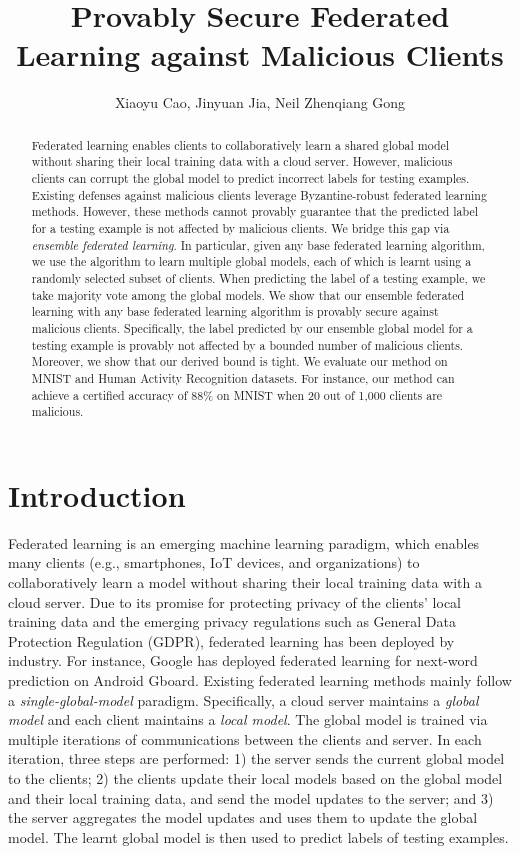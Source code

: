 \documentclass[letterpaper]{article} %
\title{Provably Secure Federated Learning against Malicious Clients}
\author{
       Xiaoyu Cao,
       Jinyuan Jia,
       Neil Zhenqiang Gong \\
}
\begin{document}
\maketitle



\begin{abstract}
Federated learning enables clients to collaboratively learn a shared global model without sharing their local training data with a cloud server. However, malicious clients can corrupt the global model to predict incorrect labels for testing examples. Existing defenses against malicious clients leverage Byzantine-robust federated learning methods. However, these methods cannot provably guarantee that the predicted label for a testing example is  not affected by malicious clients.  We bridge this gap via \emph{ensemble federated learning}.  In particular, given any base federated learning algorithm, we use the algorithm to learn multiple global models, each of which is learnt using a randomly selected subset of clients. When predicting the label of a testing example, we take majority vote among the  global models. We show that our ensemble federated learning with any base federated learning algorithm is provably secure against malicious clients. Specifically, the label predicted by our ensemble global model for a testing example is provably not affected by a bounded number of malicious clients. Moreover, we show that our derived bound is tight. We evaluate our method on MNIST and Human Activity Recognition datasets. For instance, our method can achieve a certified accuracy of 88\% on MNIST when 20 out of 1,000 clients are malicious.
\end{abstract}


\section{Introduction}

Federated learning \cite{konevcny2016federated,mcmahan2016communication} is an emerging machine learning paradigm, which enables many clients (e.g., smartphones, IoT devices, and organizations) to collaboratively learn a model without sharing their local training data with a cloud server. Due to its promise for protecting privacy of the clients' local training data and the emerging privacy regulations such as General Data Protection Regulation (GDPR), federated learning has been deployed by industry. For instance, Google has deployed  federated learning for next-word prediction on Android Gboard.  Existing federated learning methods mainly follow a \emph{single-global-model} paradigm.  Specifically, a cloud server maintains a \emph{global model} and each client maintains a \emph{local model}.  The global model is trained via multiple iterations of communications between the clients and server. In each iteration, three steps are performed: 1) the server sends the current global model to the clients; 2) the clients update their local models based on the global model and their local training data, and send the model updates to the server; and 3) the server aggregates the model updates and uses them to update the global model. The learnt global model is then used to predict labels of testing examples.
\end{document}
